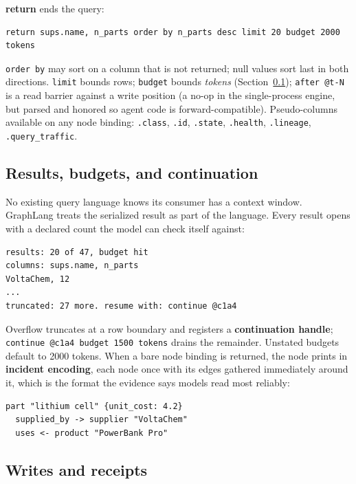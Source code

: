 \documentclass[11pt]{article}
\begin{document}
\textbf{return} ends the query:

\begin{lstlisting}[style=gl]
return sups.name, n_parts order by n_parts desc limit 20 budget 2000 tokens
\end{lstlisting}

\texttt{order by} may sort on a column that is not returned; null values sort last in both directions. \texttt{limit} bounds rows; \texttt{budget} bounds \emph{tokens} (Section~\ref{sec:results}); \texttt{after @t-N} is a read barrier against a write position (a no-op in the single-process engine, but parsed and honored so agent code is forward-compatible). Pseudo-columns available on any node binding: \texttt{.class}, \texttt{.id}, \texttt{.state}, \texttt{.health}, \texttt{.lineage}, \texttt{.query\_traffic}.

\subsection{Results, budgets, and continuation}\label{sec:results}

No existing query language knows its consumer has a context window. GraphLang treats the serialized result as part of the language. Every result opens with a declared count the model can check itself against:

\begin{lstlisting}[style=res]
results: 20 of 47, budget hit
columns: sups.name, n_parts
VoltaChem, 12
...
truncated: 27 more. resume with: continue @c1a4
\end{lstlisting}

Overflow truncates at a row boundary and registers a \textbf{continuation handle}; \texttt{continue @c1a4 budget 1500 tokens} drains the remainder. Unstated budgets default to 2000 tokens. When a bare node binding is returned, the node prints in \textbf{incident encoding}, each node once with its edges gathered immediately around it, which is the format the evidence says models read most reliably:

\begin{lstlisting}[style=res]
part "lithium cell" {unit_cost: 4.2}
  supplied_by -> supplier "VoltaChem"
  uses <- product "PowerBank Pro"
\end{lstlisting}

\subsection{Writes and receipts}
\end{document}
